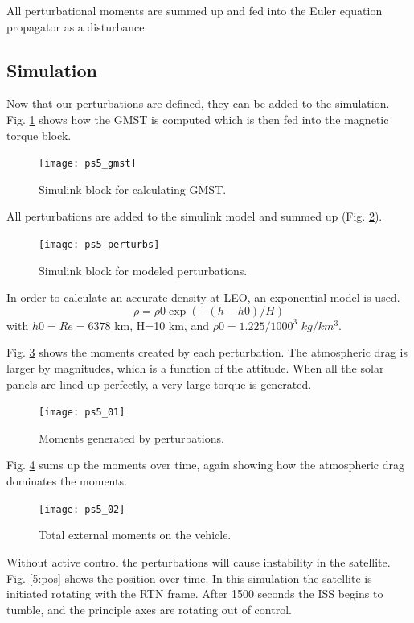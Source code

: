 \documentclass[12pt, letterpaper]{article}
\begin{document}
All perturbational moments are summed up and fed into the Euler equation propagator as a disturbance.

\subsection{Simulation}

Now that our perturbations are defined, they can be added to the simulation. Fig. \ref{5:gmst} shows how the GMST is computed which is then fed into the magnetic torque block.

\begin{figure}[H]
	\centering
	\texttt{[image: ps5\_gmst]}
	\caption{Simulink block for calculating GMST.}
	\label{5:gmst}
\end{figure}

All perturbations are added to the simulink model and summed up (Fig. \ref{5:perturb}). 

\begin{figure}[H]
	\centering
	\texttt{[image: ps5\_perturbs]}
	\caption{Simulink block for modeled perturbations.}
	\label{5:perturb}
\end{figure}

In order to calculate an accurate density at LEO, an exponential model is used. $$\rho=\rho0\exp(-(h-h0)/H)$$ with $h0=Re=6378$ km, H=10 km, and $\rho0=1.225/1000^3$ $kg/km^3$.


Fig. \ref{5:01} shows the moments created by each perturbation. The atmospheric drag is larger by magnitudes, which is a function of the attitude. When all the solar panels are lined up perfectly, a very large torque is generated.

\begin{figure}[H]
	\centering
	\texttt{[image: ps5\_01]}
	\caption{Moments generated by perturbations.}
	\label{5:01}
\end{figure}

Fig. \ref{5:02} sums up the moments over time, again showing how the atmospheric drag dominates the moments.

\begin{figure}[H]
	\centering
	\texttt{[image: ps5\_02]}
	\caption{Total external moments on the vehicle.}
	\label{5:02}
\end{figure}

Without active control the perturbations will cause instability in the satellite. Fig. \ref{5:pos} shows the position over time. In this simulation the satellite is initiated rotating with the RTN frame. After 1500 seconds the ISS begins to tumble, and the principle axes are rotating out of control.
\end{document}
